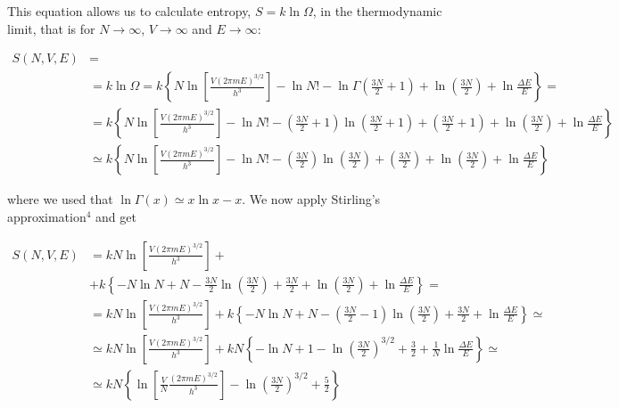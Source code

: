 \documentclass[12pt,a4paper]{report}
\newcommand{\esp}{\vspace{0.5cm}}
\begin{document}
	\esp
	
	\noindent This equation allows us to calculate entropy, $S = k \ln \Omega$, in the thermodynamic limit, that is for $N \to \infty$, $V \to \infty$ and $E \to \infty$:
	
	\esp
	
	\begin{align}
		S(N,V,E) &= \\
		&= k \ln \Omega = k \left\{ N \ln \left[ \frac{V(2\pi m E)^{3/2}}{h^3} \right] - \ln N! - \ln \Gamma\left(\frac{3N}{2} + 1\right) + \ln\left(\frac{3N}{2}\right) + \ln \frac{\Delta E}{E} \right\} = \\
		&= k \left\{ N \ln \left[ \frac{V(2\pi m E)^{3/2}}{h^3} \right] - \ln N! - \left(\frac{3N}{2} + 1\right) \ln\left(\frac{3N}{2} + 1\right) + \left(\frac{3N}{2} + 1\right) + \ln\left(\frac{3N}{2}\right) + \ln \frac{\Delta E}{E} \right\} \\
		&\simeq k \left\{ N \ln \left[ \frac{V(2\pi m E)^{3/2}}{h^3} \right] - \ln N! - \left(\frac{3N}{2}\right) \ln\left(\frac{3N}{2}\right) + \left(\frac{3N}{2}\right) + \ln\left(\frac{3N}{2}\right) + \ln \frac{\Delta E}{E} \right\}
	\end{align}
	
	\esp
	
	\noindent where we used that $\ln \Gamma(x) \simeq x \ln x - x$. We now apply Stirling's approximation$^4$ and get
	
	\esp
	
	\begin{align}
		S(N,V,E) &= kN \ln \left[ \frac{V(2\pi m E)^{3/2}}{h^3} \right] + \\
		&+ k \left\{ -N \ln N + N - \frac{3N}{2} \ln \left(\frac{3N}{2}\right) + \frac{3N}{2} + \ln\left(\frac{3N}{2}\right) + \ln \frac{\Delta E}{E} \right\} = \\
		&= kN \ln \left[ \frac{V(2\pi m E)^{3/2}}{h^3} \right] + k \left\{ -N \ln N + N - \left(\frac{3N}{2} - 1\right) \ln \left(\frac{3N}{2}\right) + \frac{3N}{2} + \ln \frac{\Delta E}{E} \right\} \simeq \\
		&\simeq kN \ln \left[ \frac{V(2\pi m E)^{3/2}}{h^3} \right] + kN \left\{ -\ln N + 1 - \ln \left(\frac{3N}{2}\right)^{3/2} + \frac{3}{2} + \frac{1}{N} \ln \frac{\Delta E}{E} \right\} \simeq \\
		&\simeq kN \left\{ \ln \left[ \frac{V}{N} \frac{(2\pi m E)^{3/2}}{h^3} \right] - \ln \left(\frac{3N}{2}\right)^{3/2} + \frac{5}{2} \right\}
	\end{align}
	
	\esp
	
\end{document}
